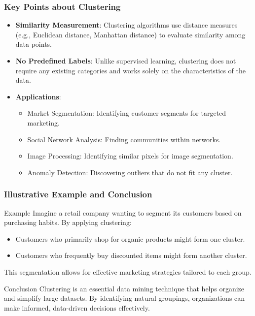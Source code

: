 \documentclass[aspectratio=169]{beamer}
\begin{document}
\begin{frame}[fragile]
    \frametitle{Key Points about Clustering}

    \begin{itemize}
        \item \textbf{Similarity Measurement}: Clustering algorithms use distance measures (e.g., Euclidean distance, Manhattan distance) to evaluate similarity among data points.
        
        \item \textbf{No Predefined Labels}: Unlike supervised learning, clustering does not require any existing categories and works solely on the characteristics of the data.
        
        \item \textbf{Applications}: 
        \begin{itemize}
            \item Market Segmentation: Identifying customer segments for targeted marketing.
            \item Social Network Analysis: Finding communities within networks.
            \item Image Processing: Identifying similar pixels for image segmentation.
            \item Anomaly Detection: Discovering outliers that do not fit any cluster.
        \end{itemize}
    \end{itemize}
\end{frame}

\begin{frame}[fragile]
    \frametitle{Illustrative Example and Conclusion}

    \begin{block}{Example}
        Imagine a retail company wanting to segment its customers based on purchasing habits. By applying clustering:
        \begin{itemize}
            \item Customers who primarily shop for organic products might form one cluster.
            \item Customers who frequently buy discounted items might form another cluster.
        \end{itemize}
        This segmentation allows for effective marketing strategies tailored to each group.
    \end{block}

    \begin{block}{Conclusion}
        Clustering is an essential data mining technique that helps organize and simplify large datasets. 
        By identifying natural groupings, organizations can make informed, data-driven decisions effectively.
    \end{block}
\end{frame}
\end{document}
